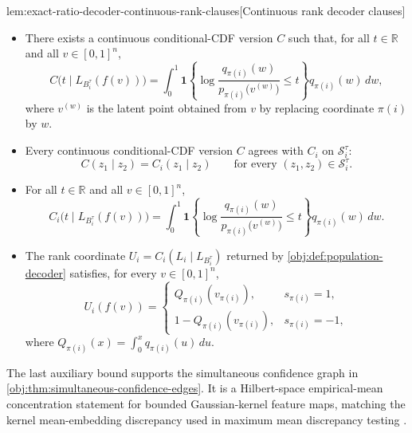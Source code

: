 \begin{lemmav}{lem:exact-ratio-decoder-continuous-rank-clauses}[Continuous rank decoder clauses]
\begin{itemize}
\item There exists a continuous conditional-CDF version \(C\) such that, for all \(t\in\mathbb R\) and all \(v\in[0,1]^n\),
\[
C\bigl(t\mid L_{B_i^\tau}(f(v))\bigr)
=
\int_0^1
\mathbf 1\!\left\{\log\frac{q_{\pi(i)}(w)}
{p_{\pi(i)}\bigl(v^{(w)}\bigr)}\le t\right\}
q_{\pi(i)}(w)\,dw,
\]
where \(v^{(w)}\) is the latent point obtained from \(v\) by replacing coordinate \(\pi(i)\) by \(w\).
\item Every continuous conditional-CDF version \(C\) agrees with \(C_i\) on \(\mathcal S_i^\tau\):
\[
C(z_1\mid z_2)=C_i(z_1\mid z_2)
\qquad\text{for every }(z_1,z_2)\in\mathcal S_i^\tau.
\]
\item For all \(t\in\mathbb R\) and all \(v\in[0,1]^n\),
\[
C_i\bigl(t\mid L_{B_i^\tau}(f(v))\bigr)
=
\int_0^1
\mathbf 1\!\left\{\log\frac{q_{\pi(i)}(w)}
{p_{\pi(i)}\bigl(v^{(w)}\bigr)}\le t\right\}
q_{\pi(i)}(w)\,dw.
\]
\item The rank coordinate \(U_i=C_i(L_i\mid L_{B_i^\tau})\) returned by \cref{obj:def:population-decoder} satisfies, for every \(v\in[0,1]^n\),
\[
U_i(f(v))
=
\begin{cases}
Q_{\pi(i)}(v_{\pi(i)}), & s_{\pi(i)}=1,\\
1-Q_{\pi(i)}(v_{\pi(i)}), & s_{\pi(i)}=-1,
\end{cases}
\]
where \(Q_{\pi(i)}(x)=\int_0^x q_{\pi(i)}(u)\,du\).
\end{itemize}
\end{lemmav}

The last auxiliary bound supports the simultaneous confidence graph in \cref{obj:thm:simultaneous-confidence-edges}. It is a Hilbert-space empirical-mean concentration statement for bounded Gaussian-kernel feature maps, matching the kernel mean-embedding discrepancy used in maximum mean discrepancy testing \citep{GrettonEtAl2012KernelTwoSample,SchrabEtAl2023MMDAgg}.

